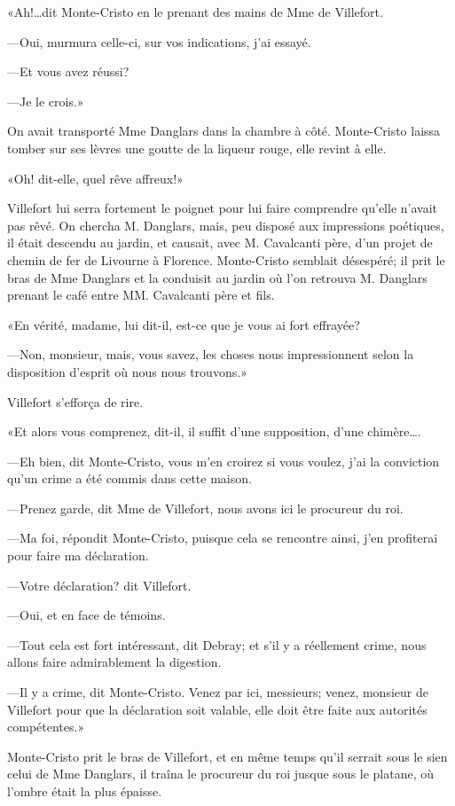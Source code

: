 «Ah!\dots dit Monte-Cristo en le prenant des mains de Mme de Villefort. 

—Oui, murmura celle-ci, sur vos indications, j'ai essayé. 

—Et vous avez réussi? 

—Je le crois.» 

On avait transporté Mme Danglars dans la chambre à côté. Monte-Cristo laissa tomber sur ses lèvres une goutte de la liqueur rouge, elle revint à elle. 

«Oh! dit-elle, quel rêve affreux!» 

Villefort lui serra fortement le poignet pour lui faire comprendre qu'elle n'avait pas rêvé. On chercha M. Danglars, mais, peu disposé aux impressions poétiques, il était descendu au jardin, et causait, avec M. Cavalcanti père, d'un projet de chemin de fer de Livourne à Florence. Monte-Cristo semblait désespéré; il prit le bras de Mme Danglars et la conduisit au jardin où l'on retrouva M. Danglars prenant le café entre MM. Cavalcanti père et fils. 

«En vérité, madame, lui dit-il, est-ce que je vous ai fort effrayée? 

—Non, monsieur, mais, vous savez, les choses nous impressionnent selon la disposition d'esprit où nous nous trouvons.» 

Villefort s'efforça de rire. 

«Et alors vous comprenez, dit-il, il suffit d'une supposition, d'une chimère\dots. 

—Eh bien, dit Monte-Cristo, vous m'en croirez si vous voulez, j'ai la conviction qu'un crime a été commis dans cette maison. 

—Prenez garde, dit Mme de Villefort, nous avons ici le procureur du roi. 

—Ma foi, répondit Monte-Cristo, puisque cela se rencontre ainsi, j'en profiterai pour faire ma déclaration. 

—Votre déclaration? dit Villefort. 

—Oui, et en face de témoins. 

—Tout cela est fort intéressant, dit Debray; et s'il y a réellement crime, nous allons faire admirablement la digestion. 

—Il y a crime, dit Monte-Cristo. Venez par ici, messieurs; venez, monsieur de Villefort pour que la déclaration soit valable, elle doit être faite aux autorités compétentes.» 

Monte-Cristo prit le bras de Villefort, et en même temps qu'il serrait sous le sien celui de Mme Danglars, il traîna le procureur du roi jusque sous le platane, où l'ombre était la plus épaisse. 

